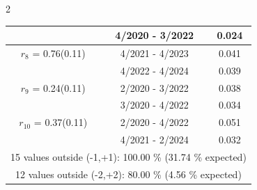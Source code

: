 \begin{multicols}{2}
{\begin{tabular}{ccc}
&        4/2020 -  3/2022 &        0.024  \vspace{-.02in} \\ \hline 
  $r_{ 8}$ = 0.76(0.11) &       4/2021 -  4/2023 &        0.041   \vspace{-.10in} \\  
&        4/2022 -  4/2024 &        0.039  \vspace{-.02in} \\ \hline 
  $r_{ 9}$ = 0.24(0.11) &       2/2020 -  3/2022 &        0.038   \vspace{-.10in} \\  
&        3/2020 -  4/2022 &        0.034  \vspace{-.02in} \\ \hline 
  $r_{10}$ = 0.37(0.11) &       2/2020 -  4/2022 &        0.051   \vspace{-.10in} \\  
&        4/2021 -  2/2024 &        0.032  \vspace{-.02in} \\ \hline 
\multicolumn{3}{c}{              15 values outside (-1,+1): 100.00  \% (31.74  \% expected)}\vspace{-.10in} \\ 
\multicolumn{3}{c}{              12 values outside (-2,+2): 80.00 \%  (4.56 \% expected) } \\
 \end{tabular} \\ 
 } 
\end{multicols} 
